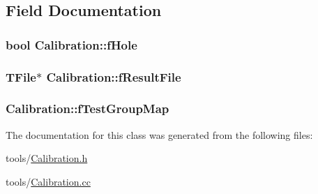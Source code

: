 \subsection{Field Documentation}
\hypertarget{class_calibration_a669c7e7de313d082ec526a01f1dfa99f}{
\subsubsection[{f\-Hole}]{\setlength{\rightskip}{0pt plus 5cm}bool Calibration\-::f\-Hole\hspace{0.3cm}{\ttfamily [private]}}}\label{class_calibration_a669c7e7de313d082ec526a01f1dfa99f}
\hypertarget{class_calibration_a2eb24fa3646d79398c13d36e6a312a60}{
\subsubsection[{f\-Result\-File}]{\setlength{\rightskip}{0pt plus 5cm}T\-File$\ast$ Calibration\-::f\-Result\-File\hspace{0.3cm}{\ttfamily [private]}}}\label{class_calibration_a2eb24fa3646d79398c13d36e6a312a60}
\hypertarget{class_calibration_ac79d5ebc2766ebc9c5faf384a05581b0}{
\subsubsection[{f\-Test\-Group\-Map}]{ Calibration\-::f\-Test\-Group\-Map\hspace{0.3cm}{\ttfamily [private]}}}\label{class_calibration_ac79d5ebc2766ebc9c5faf384a05581b0}


The documentation for this class was generated from the following files\-:\begin{DoxyCompactItemize}
\item 
tools/\hyperlink{_calibration_8h}{Calibration.\-h}\item 
tools/\hyperlink{_calibration_8cc}{Calibration.\-cc}\end{DoxyCompactItemize}
